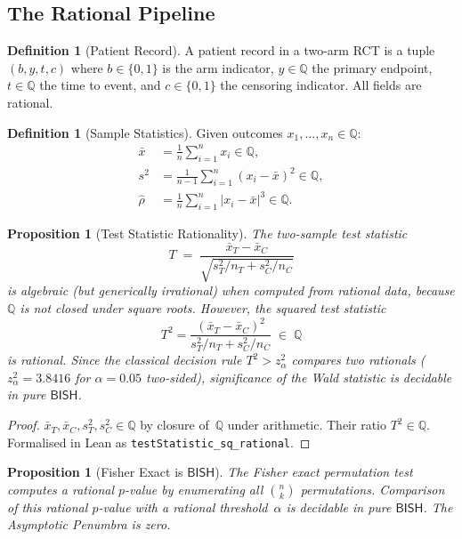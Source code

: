 \documentclass[11pt,a4paper]{article}
\theoremstyle{plain}
\newtheorem{proposition}[theorem]{Proposition}
\theoremstyle{definition}
\newtheorem{definition}[theorem]{Definition}
\newcommand{\BISH}{\textsf{BISH}}
\newcommand{\Q}{\mathbb{Q}}
\begin{document}
\subsection{The Rational Pipeline}

\begin{definition}[Patient Record]
A patient record in a two-arm RCT is a tuple $(b, y, t, c)$ where $b \in \{0,1\}$ is the arm indicator, $y \in \Q$ the primary endpoint, $t \in \Q$ the time to event, and $c \in \{0,1\}$ the censoring indicator.  All fields are rational.
\end{definition}

\begin{definition}[Sample Statistics]
Given outcomes $x_1, \ldots, x_n \in \Q$:
\begin{align*}
\bar x &= \frac{1}{n}\sum_{i=1}^n x_i \in \Q, \\
s^2 &= \frac{1}{n-1}\sum_{i=1}^n (x_i - \bar x)^2 \in \Q, \\
\hat\rho &= \frac{1}{n}\sum_{i=1}^n |x_i - \bar x|^3 \in \Q.
\end{align*}
\end{definition}

\begin{proposition}[Test Statistic Rationality]\label{prop:rational-test}
The two-sample test statistic
\[
  T \;=\; \frac{\bar x_T - \bar x_C}{\sqrt{s_T^2/n_T + s_C^2/n_C}}
\]
is algebraic (but generically irrational) when computed from rational data, because $\Q$ is not closed under square roots.  However, the \emph{squared} test statistic
\[
  T^2 = \frac{(\bar x_T - \bar x_C)^2}{s_T^2/n_T + s_C^2/n_C} \;\in\; \Q
\]
is rational.  Since the classical decision rule $T^2 > z_\alpha^2$ compares two rationals ($z_\alpha^2 = 3.8416$ for $\alpha = 0.05$ two-sided), significance of the Wald statistic is decidable in pure $\BISH$.
\end{proposition}

\begin{proof}
$\bar x_T, \bar x_C, s_T^2, s_C^2 \in \Q$ by closure of~$\Q$ under arithmetic.  Their ratio $T^2 \in \Q$.  Formalised in Lean as \texttt{testStatistic\_sq\_rational}.
\end{proof}

\begin{proposition}[Fisher Exact is $\BISH$]\label{prop:fisher}
The Fisher exact permutation test computes a rational $p$-value by enumerating all $\binom{n}{k}$ permutations.  Comparison of this rational $p$-value with a rational threshold~$\alpha$ is decidable in pure $\BISH$.  The Asymptotic Penumbra is \emph{zero}.
\end{proposition}
\end{document}
